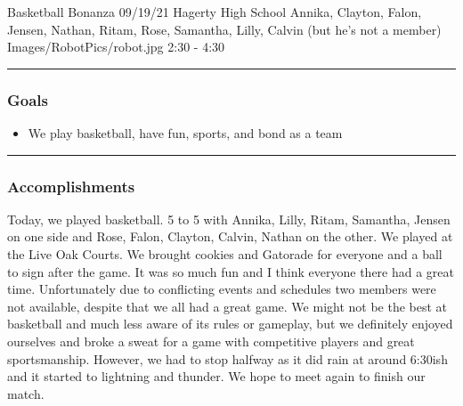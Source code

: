 \insertmeeting 
	{Basketball Bonanza} 
	{09/19/21}
	{Hagerty High School}
	{Annika, Clayton, Falon, Jensen, Nathan, Ritam, Rose, Samantha, Lilly, Calvin (but he’s not a member)}
	{Images/RobotPics/robot.jpg}
	{2:30 - 4:30}
	
\noindent\hfil\rule{\textwidth}{.4pt}\hfil
\subsubsection*{Goals}
\begin{itemize}
    \item We play basketball, have fun, sports, and bond as a team  

\end{itemize} 

\noindent\hfil\rule{\textwidth}{.4pt}\hfil

\subsubsection*{Accomplishments}
Today, we played basketball. 5 to 5 with Annika, Lilly, Ritam, Samantha, Jensen on one side and Rose, Falon, Clayton, Calvin, Nathan on the other. We played at the Live Oak Courts. We brought cookies and Gatorade for everyone and a ball to sign after the game. It was so much fun and I think everyone there had a great time. Unfortunately due to conflicting events and schedules two members were not available, despite that we all had a great game.  We might not be the best at basketball and much less aware of its rules or gameplay, but we definitely enjoyed ourselves and broke a sweat for a game with competitive players and great sportsmanship. However, we had to stop halfway as it did rain at around 6:30ish and it started to lightning and thunder. We hope to meet again to finish our match. 

